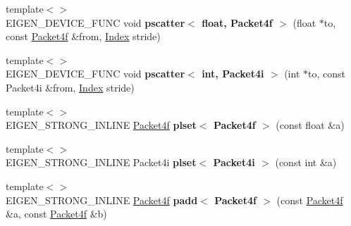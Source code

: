 \begin{DoxyCompactItemize}
\item 
\mbox{\label{namespace_eigen_1_1internal_a98f3ee4a4735562e01d8054546b4352d}} 
{\footnotesize template$<$$>$ }\\E\+I\+G\+E\+N\+\_\+\+D\+E\+V\+I\+C\+E\+\_\+\+F\+U\+NC void {\bfseries pscatter$<$ float, Packet4f $>$} (float $\ast$to, const \hyperlink{struct_eigen_1_1internal_1_1_packet4f}{Packet4f} \&from, \hyperlink{namespace_eigen_a62e77e0933482dafde8fe197d9a2cfde}{Index} stride)
\item 
\mbox{\label{namespace_eigen_1_1internal_a4f1976274be8765e8b890106c1f0edba}} 
{\footnotesize template$<$$>$ }\\E\+I\+G\+E\+N\+\_\+\+D\+E\+V\+I\+C\+E\+\_\+\+F\+U\+NC void {\bfseries pscatter$<$ int, Packet4i $>$} (int $\ast$to, const Packet4i \&from, \hyperlink{namespace_eigen_a62e77e0933482dafde8fe197d9a2cfde}{Index} stride)
\item 
\mbox{\label{namespace_eigen_1_1internal_ae62a34e75a1b533d4baaea4a1719bd45}} 
{\footnotesize template$<$$>$ }\\E\+I\+G\+E\+N\+\_\+\+S\+T\+R\+O\+N\+G\+\_\+\+I\+N\+L\+I\+NE \hyperlink{struct_eigen_1_1internal_1_1_packet4f}{Packet4f} {\bfseries plset$<$ Packet4f $>$} (const float \&a)
\item 
\mbox{\label{namespace_eigen_1_1internal_ac2a7b21b9cb3ee5ba528785ee4eb82b4}} 
{\footnotesize template$<$$>$ }\\E\+I\+G\+E\+N\+\_\+\+S\+T\+R\+O\+N\+G\+\_\+\+I\+N\+L\+I\+NE Packet4i {\bfseries plset$<$ Packet4i $>$} (const int \&a)
\item 
\mbox{\label{namespace_eigen_1_1internal_a1b00ef4c11d9b491edfbee232e5bea00}} 
{\footnotesize template$<$$>$ }\\E\+I\+G\+E\+N\+\_\+\+S\+T\+R\+O\+N\+G\+\_\+\+I\+N\+L\+I\+NE \hyperlink{struct_eigen_1_1internal_1_1_packet4f}{Packet4f} {\bfseries padd$<$ Packet4f $>$} (const \hyperlink{struct_eigen_1_1internal_1_1_packet4f}{Packet4f} \&a, const \hyperlink{struct_eigen_1_1internal_1_1_packet4f}{Packet4f} \&b)
\item 
\mbox{\label{namespace_eigen_1_1internal_a722391996fdea3f6d4b7b6b10b057b5a}} 

\end{DoxyCompactItemize}
